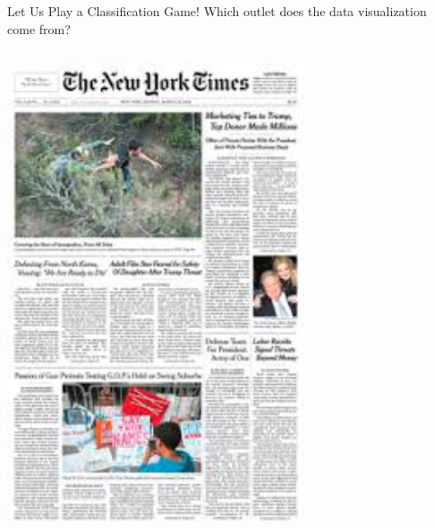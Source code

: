 \documentclass[notes, aspectratio=1610]{beamer}
\begin{document}
\begin{frame}{Let Us Play a Classification Game!}
	{Which outlet does the data visualization come from?}
	\begin{columns}
		\begin{column}{0.25\textwidth}
			\includegraphics[width=1\textwidth]{images/nyt}
		\end{column}
		\begin{column}{0.23\textwidth}

\end{column}
\end{columns}
\end{frame}
\end{document}
